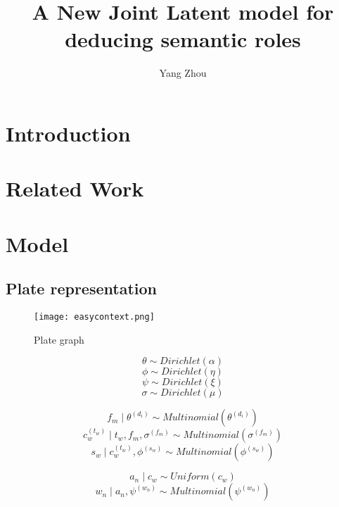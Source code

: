 \documentclass{article}
\title{A New Joint Latent model for deducing semantic roles}
\author{Yang Zhou}
\begin{document}
\maketitle

\section{Introduction}


\section{Related Work}

\section{Model}
\subsection{Plate representation}
\begin{figure}[htb]
\centering
\texttt{[image: easycontext.png]}
\caption{Plate graph}
\label{Figure 1}
\end{figure}


$$\theta \sim Dirichlet(\alpha)$$
$$\phi  \sim Dirichlet(\eta)$$
$$\psi \sim Dirichlet(\xi)$$
$$\sigma \sim Dirichlet(\mu)$$

$$f_m\mid\theta^{(d_i)} \sim Multinomial(\theta^{(d_i)})$$
$$c_w^{(t_w)}\mid t_w,f_m,\sigma^{(f_m)} \sim Multinomial(\sigma^{(f_m)}) $$
$$s_w \mid c_w^{(t_w)},\phi^{(s_w)} \sim Multinomial(\phi^{(s_w)})$$

$$ a_n\mid c_w \sim Uniform(c_w) $$
$$ w_n \mid a_n, \psi^{(w_n)} \sim Multinomial(\psi^{(w_n)})$$
\end{document}
